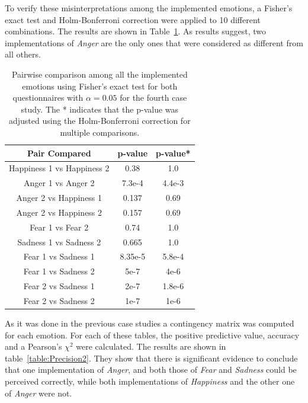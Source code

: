 To verify these misinterpretations among the implemented emotions, a Fisher's exact test and Holm-Bonferroni correction were applied to 10 different combinations. The results are shown in Table~\ref{table:result_compare_fourth}. As results suggest, two implementations of \textit{Anger} are the only ones that were considered as different from all others.

\begin{table}[h]
\centering
\small
\caption{Pairwise comparison among all the implemented emotions using Fisher's exact test for both questionnaires with $\alpha = 0.05$ for the fourth case study. The * indicates that the p-value was adjusted using the Holm-Bonferroni correction for multiple comparisons.}
		\label{table:result_compare_fourth}
		\begin{tabular}{|c|c|c|}
			\hline	
\textbf{Pair Compared} & \textbf{p-value} & \textbf{p-value*}\\	
			\hline
			Happiness 1 vs Happiness 2 &0.38&1.0\\
			\hline
			Anger 1 vs Anger 2 & 7.3e-4&4.4e-3\\
			\hline
			Anger 2 vs Happiness 1 & 0.137&0.69\\
			\hline
			Anger 2 vs Happiness 2 & 0.157&0.69\\
			\hline
			Fear 1 vs Fear 2 & 0.74&1.0\\
			\hline
			Sadness 1 vs Sadness 2 & 0.665&1.0\\
			\hline
			Fear 1 vs Sadness 1& 8.35e-5&5.8e-4\\
			\hline
			Fear 1 vs Sadness 2 & 5e-7&4e-6\\
			\hline
			Fear 2 vs Sadness 1 & 2e-7&1.8e-6\\
			\hline
			Fear 2 vs Sadness 2 & 1e-7&1e-6\\
			\hline
			\end{tabular}
\end{table}
 
As it was done in the previous case studies a contingency matrix was computed for each emotion. 
For each of these tables, the positive predictive value, accuracy and a Pearson's $\chi^2$ were calculated. The results are shown in table~\ref{table:Precision2}. They show that there is significant evidence to conclude that one implementation of \textit{Anger}, and both those of \textit{Fear} and \textit{Sadness} could be perceived correctly, while both implementations of \textit{Happiness} and the other one of \textit{Anger} were not.

